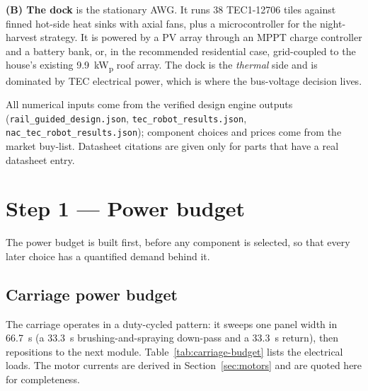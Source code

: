 \documentclass[11pt,a4paper]{article}
\begin{document}
\textbf{(B) The dock} is the stationary AWG. It runs \num{38} TEC1-12706 tiles
against finned hot-side heat sinks with axial fans, plus a microcontroller for
the night-harvest strategy. It is powered by a PV array through an MPPT charge
controller and a battery bank, or, in the recommended residential case,
grid-coupled to the house's existing \SI{9.9}{\kilo\watt_{p}} roof array. The
dock is the \emph{thermal} side and is dominated by TEC electrical power, which
is where the bus-voltage decision lives.

All numerical inputs come from the verified design engine outputs
(\texttt{rail\_guided\_design.json}, \texttt{tec\_robot\_results.json},
\texttt{nac\_tec\_robot\_results.json}); component choices and prices come from
the market buy-list. Datasheet citations are given only for parts that have a
real datasheet entry.

\section{Step 1 --- Power budget}
\label{sec:budget}

The power budget is built first, before any component is selected, so that every
later choice has a quantified demand behind it.

\subsection{Carriage power budget}

The carriage operates in a duty-cycled pattern: it sweeps one panel width in
\SI{66.7}{\second} (a \SI{33.3}{\second} brushing-and-spraying down-pass and a
\SI{33.3}{\second} return), then repositions to the next module. Table~\ref{tab:carriage-budget}
lists the electrical loads. The motor currents are derived in
Section~\ref{sec:motors} and are quoted here for completeness.
\end{document}
